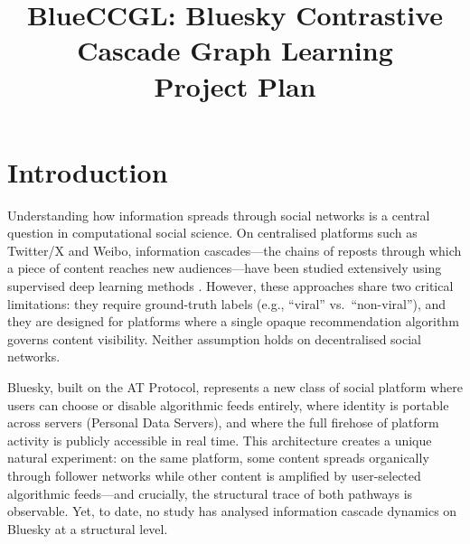\documentclass[12pt,a4paper]{article}
\title{\textbf{BlueCCGL: Bluesky Contrastive Cascade Graph Learning}\\[6pt]
       \large Project Plan}
\author{}   %
\date{}     %
\begin{document}
\maketitle

\section{Introduction}

Understanding how information spreads through social networks is a central
question in computational social science.  On centralised platforms such as
Twitter/X and Weibo, information cascades---the chains of reposts through
which a piece of content reaches new audiences---have been studied extensively
using supervised deep learning methods
\citep{chen2019cascn, cao2017deephawkes, yuan2024casflow}.  However, these
approaches share two critical limitations: they require ground-truth labels
(e.g., ``viral'' vs.\ ``non-viral''), and they are designed for platforms
where a single opaque recommendation algorithm governs content visibility.
Neither assumption holds on decentralised social networks.

Bluesky, built on the AT Protocol, represents a new class of social platform
where users can choose or disable algorithmic feeds entirely, where identity
is portable across servers (Personal Data Servers), and where the full
firehose of platform activity is publicly accessible in real time.  This
architecture creates a unique natural experiment: on the same platform, some
content spreads organically through follower networks while other content is
amplified by user-selected algorithmic feeds---and crucially, the structural
trace of both pathways is observable.  Yet, to date, no study has analysed
information cascade dynamics on Bluesky at a structural level.
\end{document}
